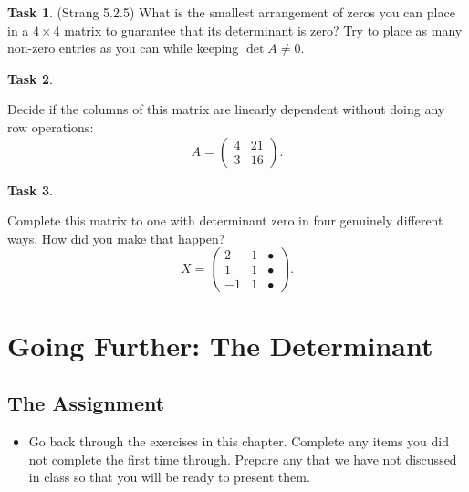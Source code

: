 \documentclass[10pt,]{book}
\theoremstyle{plain}
\theoremstyle{definition}
\numberwithin{equation}{section}
\newtheorem{task}{Task}[chapter]
\begin{document}
\begin{task}
\label{task-155}
 (Strang 5.2.5)
        What is the smallest arrangement of zeros you can place in a \(4 \times 4\)
        matrix to guarantee that its determinant is zero? Try to place as many non-zero
        entries as you can while keeping \(\det A \neq 0\).
      \end{task}
\begin{task}
\label{task-156}

        Decide if the columns of this matrix are linearly dependent without doing any
        row operations:
        \[
          A = \begin{pmatrix} 4 & 21\\ 3 & 16 \end{pmatrix}.
        \]\end{task}
\begin{task}
\label{task-157}

        Complete this matrix to one with determinant zero in four genuinely different
        ways. How did you make that happen?
        \[
          X = \begin{pmatrix} 2 & 1 & \bullet \\ 1 & 1 & \bullet
          \\ -1 & 1 & \bullet \end{pmatrix}.
        \]\end{task}
\clearpage
\typeout{************************************************}
\typeout{************************************************}
\section[Going Further: The Determinant]{Going Further: The Determinant}\label{section-det-gf}
\typeout{************************************************}
\typeout{************************************************}
\subsection[The Assignment]{The Assignment}\label{subsection-124}
\begin{itemize}
\item{}
        Go back through the exercises in this chapter. Complete any items you
        did not complete the first time through. Prepare any that we have not
        discussed in class so that you will be ready to present them.
      \end{itemize}
\typeout{************************************************}
\typeout{************************************************}
\end{document}
